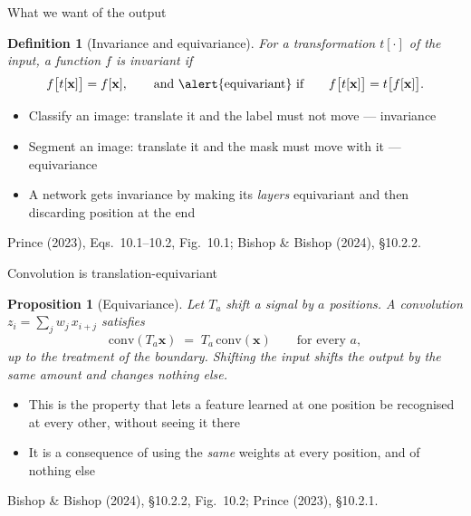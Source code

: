 \documentclass[aspectratio=169, 11pt]{beamer}
\newtheorem{propx}[theorem]{Proposition}
\newtheorem{defx}[theorem]{Definition}
\newcommand{\srcline}[1]{%
  \par\vspace{0.25em}%
  {\scriptsize\color{mcMuted}\hfill #1\par}}
\begin{document}
\begin{frame}{What we want of the output}
  \vspace{-0.2em}
  \begin{defx}[Invariance and equivariance]\label{th:inv}
    \small
    For a transformation $t[\cdot]$ of the input, a function $f$ is
    \alert{invariant} if
    \[
      f\big[t[\mathbf{x}]\big] = f[\mathbf{x}],
      \qquad\text{and \alert{equivariant} if}\qquad
      f\big[t[\mathbf{x}]\big] = t\big[f[\mathbf{x}]\big].
    \]
  \end{defx}
  \vspace{0.3em}
  {\footnotesize
  \begin{itemize}\itemsep0.22em
    \item Classify an image: translate it and the label must not move
          --- invariance
    \item Segment an image: translate it and the mask must move with it
          --- equivariance
    \item A network gets invariance by making its \emph{layers}
          equivariant and then discarding position at the end
  \end{itemize}}
  \srcline{Prince (2023), Eqs.~10.1--10.2, Fig.~10.1;
  Bishop \& Bishop (2024), \S10.2.2.}
\end{frame}

\begin{frame}{Convolution is translation-equivariant}
  \vspace{-0.1em}
  \begin{propx}[Equivariance]\label{th:equi}
    \small
    Let $T_a$ shift a signal by $a$ positions. A convolution
    $z_i = \sum_j w_j\, x_{i+j}$ satisfies
    \[
      \mathrm{conv}(T_a \mathbf{x}) \;=\; T_a\,\mathrm{conv}(\mathbf{x})
      \qquad\text{for every } a ,
    \]
    up to the treatment of the boundary. Shifting the input shifts the
    output by the same amount and changes nothing else.
  \end{propx}
  \vspace{0.3em}
  {\footnotesize
  \begin{itemize}\itemsep0.22em
    \item This is the property that lets a feature learned at one
          position be recognised at every other, without seeing it there
    \item It is a consequence of using the \emph{same} weights at every
          position, and of nothing else
  \end{itemize}}
  \srcline{Bishop \& Bishop (2024), \S10.2.2, Fig.~10.2;
  Prince (2023), \S10.2.1.}
\end{frame}
\end{document}
